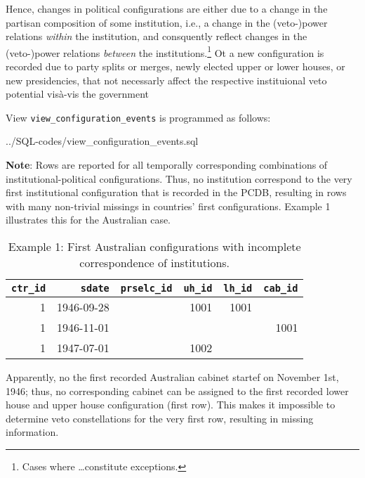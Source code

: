 Hence, changes in political configurations are either due to a change in the partisan composition of some institution, i.e., a change in the (veto-)power relations \emph{within} the institution, and consquently reflect changes in the (veto-)power relations \emph{between} the institutions.\footnote{Cases where \ldots constitute exceptions.}
Ot a new configuration is recorded due to party splits or merges, newly elected upper 
or lower houses, or new presidencies, that not necessarly affect the respective instituional veto potential vis\`a-vis the government

View \texttt{\footnotesize view\_configuration\_events} is programmed as follows:

%
{../SQL-codes/view_configuration_events.sql}

{\bf Note}: Rows are reported for all temporally corresponding combinations of institutional-political configurations. Thus, no institution correspond to the very first institutional configuration that is recorded in the PCDB, resulting in rows with many non-trivial missings in countries' first configurations. Example 1 illustrates this for the Australian case.

\begin{table}[h!]
\centering\footnotesize
\caption*{Example 1: First Australian configurations with incomplete correspondence of institutions.}
\begin{tabular}{r r r r r r}
\tabularnewline\toprule
\multicolumn{1}{r}{\texttt{\smallfont ctr\_id}}	&
\multicolumn{1}{r}{\texttt{\smallfont sdate}}	&	
\multicolumn{1}{r}{\texttt{\smallfont prselc\_id}}	&
\multicolumn{1}{r}{\texttt{\smallfont uh\_id}}	&
\multicolumn{1}{r}{\texttt{\smallfont lh\_id}}	&	
\multicolumn{1}{r}{\texttt{\smallfont cab\_id}}	\\\midrule 
1	& 1946-09-28	&	& 1001	& 1001	& 		\\
1	& 1946-11-01	& 	& 		& 		& 1001 	\\
1	& 1947-07-01	&	& 1002	&		&		\\\bottomrule
\end{tabular}
\end{table}

Apparently, no the first recorded Australian cabinet startef on November 1st, 1946; thus, no corresponding cabinet can be assigned to the first recorded lower house and upper house configuration (first row). This makes it impossible to determine veto constellations for the very first row, resulting in missing information.


